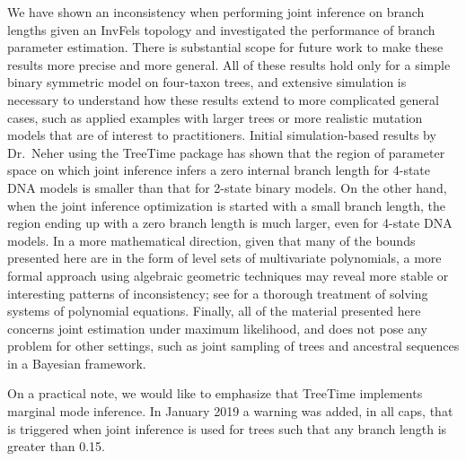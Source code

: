 \documentclass[11pt]{article}
\begin{document}

We have shown an inconsistency when performing joint inference on branch lengths given an InvFels topology and investigated the performance of branch parameter estimation.
There is substantial scope for future work to make these results more precise and more general.
All of these results hold only for a simple binary symmetric model on four-taxon trees, and extensive simulation is necessary to understand how these results extend to more complicated general cases, such as applied examples with larger trees or more realistic mutation models that are of interest to practitioners.
Initial simulation-based results by Dr.\ Neher using the TreeTime \citep{Sagulenko2018-xl} package has shown that the region of parameter space on which joint inference infers a zero internal branch length for 4-state DNA models is smaller than that for 2-state binary models.
On the other hand, when the joint inference optimization is started with a small branch length, the region ending up with a zero branch length is much larger, even for 4-state DNA models.
In a more mathematical direction, given that many of the bounds presented here are in the form of level sets of multivariate polynomials, a more formal approach using algebraic geometric techniques may reveal more stable or interesting patterns of inconsistency; see \citet{Sturmfels2002} for a thorough treatment of solving systems of polynomial equations.
Finally, all of the material presented here concerns joint estimation under maximum likelihood, and does not pose any problem for other settings, such as joint sampling of trees and ancestral sequences in a Bayesian framework.

On a practical note, we would like to emphasize that TreeTime implements marginal mode inference.
In January 2019 a warning was added, in all caps, that is triggered when joint inference is used for trees such that any branch length is greater than 0.15.
\end{document}

